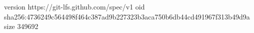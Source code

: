 version https://git-lfs.github.com/spec/v1
oid sha256:4736249c564498f464c387ad9b227323b3aca750b6db44cd491967f313b49d9a
size 349692
